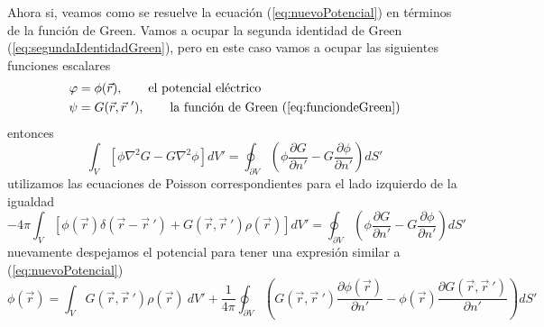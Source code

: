 \documentclass[11pt,a4paper]{article}
\begin{document}
Ahora si, veamos como se resuelve la ecuación (\ref{eq:nuevoPotencial}) en términos de la función de Green. Vamos a ocupar la segunda identidad de Green (\ref{eq:segundaIdentidadGreen}), pero en este caso vamos a ocupar las siguientes funciones escalares
\begin{align*}
\varphi&=\phi(\vec{r}),\qquad\text{el potencial eléctrico}\\
\psi&=G(\vec{r},\vec{r}\ '),\qquad\text{la función de Green (\ref{eq:funciondeGreen})}
\end{align*}
entonces
$$\int_V\left[\phi\nabla^2G-G\nabla^2\phi\right]dV'=\oint_{\partial V}\left(\phi\frac{\partial G}{\partial n'}-G\frac{\partial \phi}{\partial n'}\right)dS'$$
utilizamos las ecuaciones de Poisson correspondientes para el lado izquierdo de la igualdad
$$-4\pi\int_V\left [\phi(\vec{r})\delta(\vec{r}-\vec{r}\ ')+G(\vec{r},\vec{r}\ ')\rho(\vec{r})\right ]dV'=\oint_{\partial V}\left(\phi\frac{\partial G}{\partial n'}-G\frac{\partial \phi}{\partial n'}\right)dS'$$
nuevamente despejamos el potencial para tener una expresión similar a (\ref{eq:nuevoPotencial})
$$\phi(\vec{r})=\int_VG(\vec{r},\vec{r}\ ')\rho(\vec{r})\ dV'+\frac{1}{4\pi}\oint_{\partial V}\left(G(\vec{r},\vec{r}\ ')\frac{\partial\phi(\vec{r})}{\partial n'}-\phi(\vec{r})\frac{\partial G(\vec{r},\vec{r}\ ')}{\partial n'}\right)dS'$$
\end{document}
